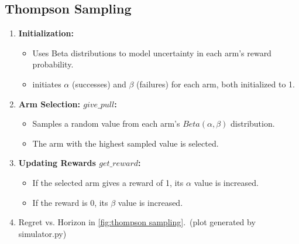 \documentclass{article}
\begin{document}
    \subsection{Thompson Sampling}
    \begin{enumerate}
        \item \textbf{Initialization:} \begin{itemize}
            \item Uses Beta distributions to model uncertainty in each arm’s reward probability.
            \item initiates $\alpha$ (successes) and $\beta$ (failures) for each arm, both initialized to 1.
        \end{itemize}

        \item \textbf{Arm Selection: \(give\_pull\):} \begin{itemize}
            \item Samples a random value from each arm’s $Beta(\alpha, \beta)$ distribution.
            \item The arm with the highest sampled value is selected.
        \end{itemize}


        \item \textbf{Updating Rewards \(get\_reward\):} \begin{itemize}
            \item If the selected arm gives a reward of 1, its $\alpha$ value is increased.
            \item If the reward is 0, its $\beta$ value is increased.
        \end{itemize}

        \item Regret vs. Horizon in \autoref{fig:thompson sampling}.\ (plot generated by simulator.py)
    \end{enumerate}

\newpage
\end{document}
